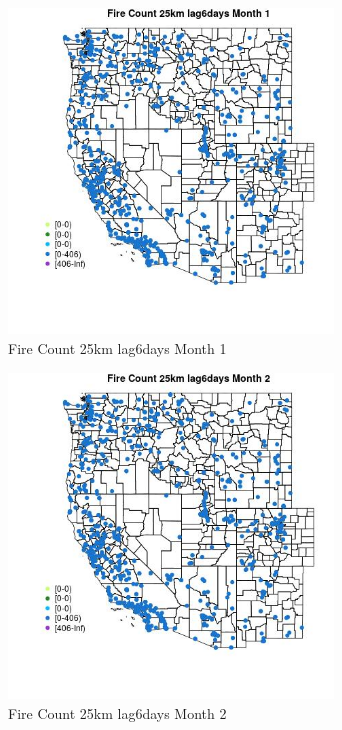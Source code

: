 \begin{figure} 
\centering  
\includegraphics[width=0.77\textwidth]{Code_Outputs/Report_ML_input_PM25_Step4_part_f_de_duplicated_aves_prioritize_24hr_obswNAs_MapObsMo1Fire_Count_25km_lag6days.jpg} 
\caption{\label{fig:Report_ML_input_PM25_Step4_part_f_de_duplicated_aves_prioritize_24hr_obswNAsMapObsMo1Fire_Count_25km_lag6days}Fire Count 25km lag6days Month 1} 
\end{figure} 
 

\begin{figure} 
\centering  
\includegraphics[width=0.77\textwidth]{Code_Outputs/Report_ML_input_PM25_Step4_part_f_de_duplicated_aves_prioritize_24hr_obswNAs_MapObsMo2Fire_Count_25km_lag6days.jpg} 
\caption{\label{fig:Report_ML_input_PM25_Step4_part_f_de_duplicated_aves_prioritize_24hr_obswNAsMapObsMo2Fire_Count_25km_lag6days}Fire Count 25km lag6days Month 2} 
\end{figure} 
 

